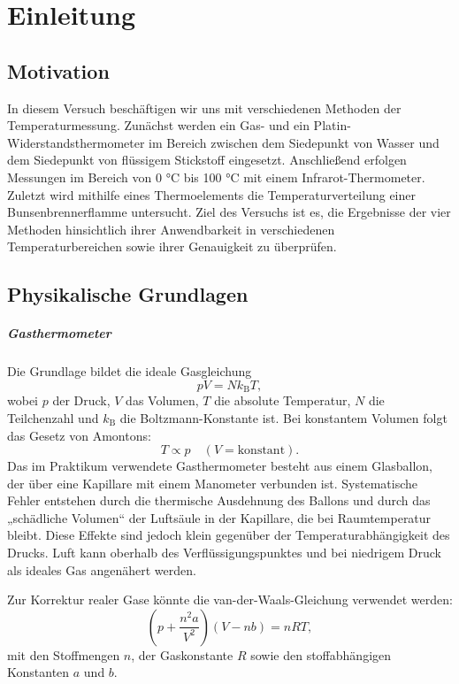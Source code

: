 \chapter{Einleitung}


\section{Motivation}
In diesem Versuch beschäftigen wir uns mit verschiedenen Methoden der Temperaturmessung. Zunächst werden ein Gas- und ein Platin-Widerstandsthermometer im Bereich zwischen dem Siedepunkt von Wasser und dem Siedepunkt von flüssigem Stickstoff eingesetzt. Anschließend erfolgen Messungen im Bereich von 0 °C bis 100 °C mit einem Infrarot-Thermometer. Zuletzt wird mithilfe eines Thermoelements die Temperaturverteilung einer Bunsenbrennerflamme untersucht. Ziel des Versuchs ist es, die Ergebnisse der vier Methoden hinsichtlich ihrer Anwendbarkeit in verschiedenen Temperaturbereichen sowie ihrer Genauigkeit zu überprüfen.

\section{Physikalische Grundlagen}
\paragraph{Gasthermometer}
Die Grundlage bildet die ideale Gasgleichung
\begin{equation}
    pV = N k_{\mathrm{B}} T,
\end{equation}
wobei $p$ der Druck, $V$ das Volumen, $T$ die absolute Temperatur, $N$ die Teilchenzahl und $k_{\mathrm{B}}$ die Boltzmann-Konstante ist.  
Bei konstantem Volumen folgt das Gesetz von Amontons:
\begin{equation}
    T \propto p \quad (V = \text{konstant}).
\end{equation}
Das im Praktikum verwendete Gasthermometer besteht aus einem Glasballon, der über eine Kapillare mit einem Manometer verbunden ist. Systematische Fehler entstehen durch die thermische Ausdehnung des Ballons und durch das „schädliche Volumen“ der Luftsäule in der Kapillare, die bei Raumtemperatur bleibt. Diese Effekte sind jedoch klein gegenüber der Temperaturabhängigkeit des Drucks. Luft kann oberhalb des Verflüssigungspunktes und bei niedrigem Druck als ideales Gas angenähert werden.  

Zur Korrektur realer Gase könnte die van-der-Waals-Gleichung verwendet werden:
\begin{equation}
    \left(p + \frac{n^2 a}{V^2}\right)(V - nb) = nRT,
\end{equation}
mit den Stoffmengen $n$, der Gaskonstante $R$ sowie den stoffabhängigen Konstanten $a$ und $b$.

